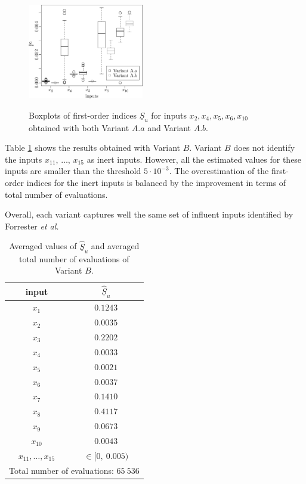 {\begin{figure}[t]
\caption{Boxplots of first-order indices $\underline{S}_u$ for inputs $x_2,x_4,x_5,x_6,x_{10}$ obtained with both Variant $A.a$ and Variant $A.b$.}
\vspace*{0.2cm}
\centering
\includegraphics[width=0.45\textwidth]{wingweight_box.eps}
\label{boxplots.wing}
\end{figure}

Table \ref{res.wing.B} shows the results obtained with Variant $B$. Variant $B$ does not identify the inputs $x_{11}$, $\dots$, $x_{15}$ as inert inputs. However, all the estimated values for these inputs are smaller than the threshold $5\cdot 10^{-3}$. The overestimation of the first-order indices for the inert inputs is balanced by the improvement in terms of total number of evaluations.

Overall, each variant captures well the same set of influent inputs identified by Forrester \textit{et al.}
\begin{table}[t]
\caption{Averaged values of $\widehat{\underline{S}}_u$ and averaged total number of evaluations of Variant $B$.}
 \centering
\begin{tabular}{cc}
\hline
 input & $\widehat{\underline{S}}_u$ \\ \hline
 $x_1$ & $0.1243$ \\ \hline
 $x_2$ & $0.0035$ \\ \hline
 $x_3$ & $0.2202$ \\ \hline
 $x_4$ & $0.0033$ \\ \hline
 $x_5$ & $0.0021$ \\ \hline
 $x_6$ & $0.0037$ \\ \hline 
 $x_7$ & $0.1410$ \\ \hline
 $x_8$ & $0.4117$ \\ \hline
 $x_9$ & $0.0673$ \\ \hline
 $x_{10}$ & $0.0043$ \\ \hline
 $x_{11},\dots,x_{15}$ & $\in [0,\ 0.005)$ \\ \hline
 \hline
\multicolumn{2}{l}{Total number of evaluations: $65 \ 536$} \\ \hline 
\end{tabular}
\label{res.wing.B}
\end{table}

}
